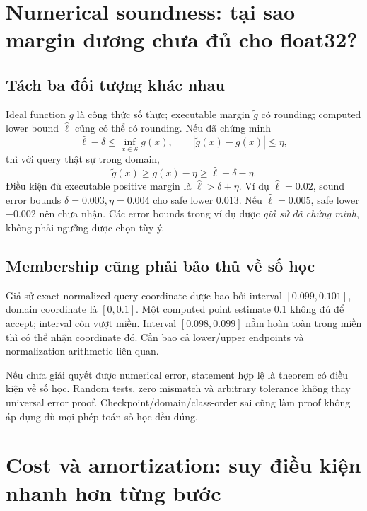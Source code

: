 \documentclass[11pt,a4paper]{article}
\newcommand{\Sset}{\mathcal S}
\theoremstyle{definition}
\begin{document}
\section{Numerical soundness: tại sao margin dương chưa đủ cho float32?}
\subsection{Tách ba đối tượng khác nhau}
Ideal function $g$ là công thức số thực; executable margin $\widetilde g$
có rounding; computed lower bound $\widehat\ell$ cũng có thể có rounding.
Nếu đã chứng minh
\begin{equation}
\widehat\ell-\delta\le\inf_{x\in\Sset}g(x),\qquad
|\widetilde g(x)-g(x)|\le\eta,
\end{equation}
thì với query thật sự trong domain,
\begin{equation}
\widetilde g(x)\ge g(x)-\eta
\ge\widehat\ell-\delta-\eta.
\end{equation}
Điều kiện đủ executable positive margin là
$\widehat\ell>\delta+\eta$. Ví dụ $\widehat\ell=0.02$, sound error bounds
$\delta=0.003,\eta=0.004$ cho safe lower 0.013. Nếu
$\widehat\ell=0.005$, safe lower $-0.002$ nên chưa nhận.
Các error bounds trong ví dụ được \emph{giả sử đã chứng minh}, không phải
ngưỡng được chọn tùy ý.

\subsection{Membership cũng phải bảo thủ về số học}
Giả sử exact normalized query coordinate được bao bởi interval
$[0.099,0.101]$, domain coordinate là $[0,0.1]$. Một computed point estimate
0.1 không đủ để accept; interval còn vượt miền. Interval
$[0.098,0.099]$ nằm hoàn toàn trong miền thì có thể nhận coordinate đó.
Cần bao cả lower/upper endpoints và normalization arithmetic liên quan.

Nếu chưa giải quyết được numerical error, statement hợp lệ là theorem có
điều kiện về số học. Random tests, zero mismatch và arbitrary tolerance
không thay universal error proof. Checkpoint/domain/class-order sai cũng
làm proof không áp dụng dù mọi phép toán số học đều đúng.

\section{Cost và amortization: suy điều kiện nhanh hơn từng bước}
\end{document}

